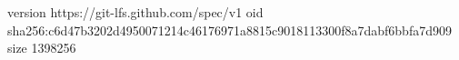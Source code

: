 version https://git-lfs.github.com/spec/v1
oid sha256:c6d47b3202d4950071214c46176971a8815c9018113300f8a7dabf6bbfa7d909
size 1398256
